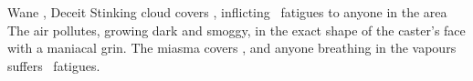   {\mWater}%
  {Wane}%
  {\detailed, \duplicated}%
  {Deceit}%
  {Stinking cloud covers \spellArea, inflicting ~\glspl{fatigue} to anyone in the area}%
  {
    The air pollutes, growing dark and smoggy, in the exact shape of the caster's face with a maniacal grin.
    The miasma covers \spellArea, and anyone breathing in the vapours suffers ~\glspl{fatigue}.
  }


